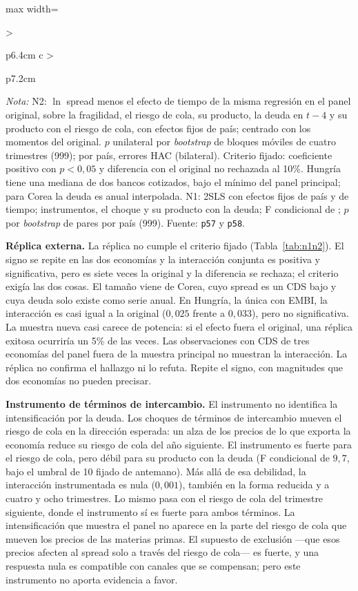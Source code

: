 \begin{table}[htbp]
\begin{adjustbox}{max width=\linewidth}
\begin{tabular}{>{\raggedright\arraybackslash}p{6.4cm} c >{\raggedright\arraybackslash}p{7.2cm}}
\bottomrule
\end{tabular}
\end{adjustbox}
\par\smallskip\parbox{0.95\linewidth}{\footnotesize \textit{Nota:} N2: $\ln$ spread menos el efecto de tiempo de la misma regresión en el panel original, sobre la fragilidad, el riesgo de cola, su producto, la deuda en $t-4$ y su producto con el riesgo de cola, con efectos fijos de país; centrado con los momentos del original. $p$ unilateral por \textit{bootstrap} de bloques móviles de cuatro trimestres (999); por país, errores HAC (bilateral). Criterio fijado: coeficiente positivo con $p<0{,}05$ y diferencia con el original no rechazada al 10\%. Hungría tiene una mediana de dos bancos cotizados, bajo el mínimo del panel principal; para Corea la deuda es anual interpolada. N1: 2SLS con efectos fijos de país y de tiempo; instrumentos, el choque y su producto con la deuda; F condicional de \citet{SandersonWindmeijer2016}; $p$ por \textit{bootstrap} de pares por país (999). Fuente: \texttt{p57} y \texttt{p58}.}
\end{table}

\textbf{Réplica externa.} La réplica no cumple el criterio fijado (Tabla~\ref{tab:n1n2}). El signo se repite en las dos economías y la interacción conjunta es positiva y significativa, pero es siete veces la original y la diferencia se rechaza; el criterio exigía las dos cosas. El tamaño viene de Corea, cuyo spread es un CDS bajo y cuya deuda solo existe como serie anual. En Hungría, la única con EMBI, la interacción es casi igual a la original ($0{,}025$ frente a $0{,}033$), pero no significativa. La muestra nueva casi carece de potencia: si el efecto fuera el original, una réplica exitosa ocurriría un 5\% de las veces. Las observaciones con CDS de tres economías del panel fuera de la muestra principal no muestran la interacción. La réplica no confirma el hallazgo ni lo refuta. Repite el signo, con magnitudes que dos economías no pueden precisar.

\textbf{Instrumento de términos de intercambio.} El instrumento no identifica la intensificación por la deuda. Los choques de términos de intercambio mueven el riesgo de cola en la dirección esperada: un alza de los precios de lo que exporta la economía reduce su riesgo de cola del año siguiente. El instrumento es fuerte para el riesgo de cola, pero débil para su producto con la deuda (F condicional de $9{,}7$, bajo el umbral de 10 fijado de antemano). Más allá de esa debilidad, la interacción instrumentada es nula ($0{,}001$), también en la forma reducida y a cuatro y ocho trimestres. Lo mismo pasa con el riesgo de cola del trimestre siguiente, donde el instrumento sí es fuerte para ambos términos. La intensificación que muestra el panel no aparece en la parte del riesgo de cola que mueven los precios de las materias primas. El supuesto de exclusión ---que esos precios afecten al spread solo a través del riesgo de cola--- es fuerte, y una respuesta nula es compatible con canales que se compensan; pero este instrumento no aporta evidencia a favor.

